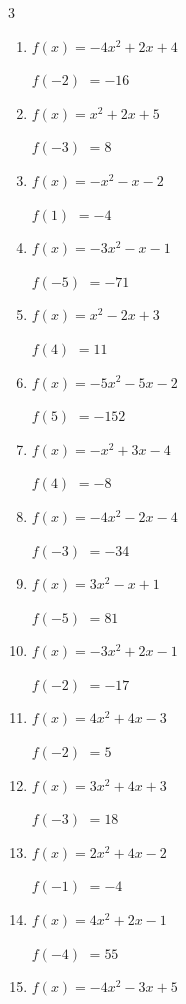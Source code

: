 \begin{multicols}{3}
\begin{enumerate}
$f(-4)$
        $= 29$

\columnbreak %

\resetques

  \item $f(x)=-4x^{2}+2x+4$

$f(-2)$
        $= -16$

  \item $f(x)=x^{2}+2x+5$

$f(-3)$
        $= 8$

  \item $f(x)=-x^{2}-x-2$

$f(1)$
        $= -4$

  \item $f(x)=-3x^{2}-x-1$

$f(-5)$
        $= -71$

  \item $f(x)=x^{2}-2x+3$

$f(4)$
        $= 11$

  \item $f(x)=-5x^{2}-5x-2$

$f(5)$
        $= -152$

  \item $f(x)=-x^{2}+3x-4$

$f(4)$
        $= -8$

  \item $f(x)=-4x^{2}-2x-4$

$f(-3)$
        $= -34$

  \item $f(x)=3x^{2}-x+1$

$f(-5)$
        $= 81$

  \item $f(x)=-3x^{2}+2x-1$

$f(-2)$
        $= -17$

  \item $f(x)=4x^{2}+4x-3$

$f(-2)$
        $= 5$

  \item $f(x)=3x^{2}+4x+3$

$f(-3)$
        $= 18$

  \item $f(x)=2x^{2}+4x-2$

$f(-1)$
        $= -4$

  \item $f(x)=4x^{2}+2x-1$

$f(-4)$
        $= 55$

  \item $f(x)=-4x^{2}-3x+5$


\end{enumerate}
\end{multicols}
